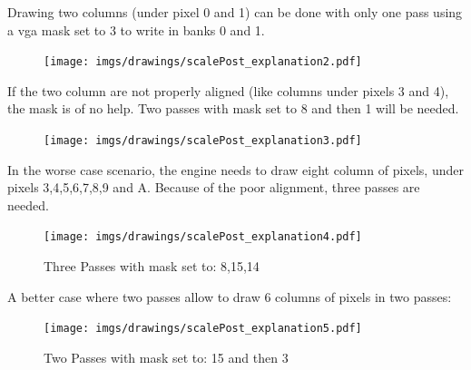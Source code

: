  Drawing two columns (under pixel 0 and 1) can be done with only one pass using a vga mask set to 3 to write in banks 0 and 1.\\
 \par
 \begin{minipage}{\textwidth}

\end{minipage}
\par

 \begin{figure}[H]
 \centering
 \texttt{[image: imgs/drawings/scalePost\_explanation2.pdf]}
 \end{figure}





If the two column are not properly aligned (like columns under pixels 3 and 4), the mask is of no help. Two passes with mask set to 8 and then 1 will be needed.\\
 \par
 \begin{minipage}{\textwidth}

\end{minipage}
\par
  \begin{figure}[H]
 \centering
 \texttt{[image: imgs/drawings/scalePost\_explanation3.pdf]}
 \end{figure}


In the worse case scenario, the engine needs to draw eight column of pixels, under pixels 3,4,5,6,7,8,9 and A. Because of the poor alignment, three passes are needed.\\
 \par
 \begin{minipage}{\textwidth}

\end{minipage}
\par
  \begin{figure}[H]
 \centering
 \texttt{[image: imgs/drawings/scalePost\_explanation4.pdf]}
 \caption{Three Passes with mask set to: 8,15,14}
 \end{figure}


A better case where two passes allow to draw 6 columns of pixels in two passes:\\
 \par
 \begin{minipage}{\textwidth}

\end{minipage}
\par
   \begin{figure}[H]
 \centering
 \texttt{[image: imgs/drawings/scalePost\_explanation5.pdf]}
  \caption{Two Passes with mask set to: 15 and then 3}
 \end{figure}






